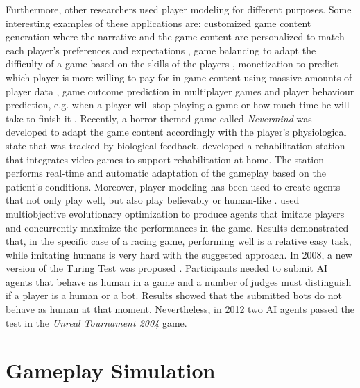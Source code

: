 Furthermore, other researchers used player modeling for different purposes. Some interesting examples of these applications are: customized game content generation where the narrative and the game content are personalized to match each player's preferences and expectations \cite{togelius_search-based_2011,yannakakis_experience-driven_2011,mateas_facade:_2003,togelius_multiobjective_2010,di_chio_evolving_2011}, game balancing to adapt the difficulty of a game based on the skills of the players \cite{lanzi_evolving_2014,hunicke_case_2005,andrade_challenge-sensitive_2005}, monetization to predict which player is more willing to pay for in-game content using massive amounts of player data \cite{fields_mobile_2014}, game outcome prediction in multiplayer games \cite{chen_player_2017,pobiedina_successful_2013,pobiedina_ranking_2013,yang_identifying_2014} and player behaviour prediction, e.g. when a player will stop playing a game or how much time he will take to finish it \cite{mahlmann_predicting_2010}.  Recently, a horror-themed game called \textit{Nevermind} \cite{lobel_designing_2016} was developed to adapt the game content accordingly with the player's physiological state that was tracked by biological feedback. 
\textcite{pirovano_self-adaptive_2012} developed a rehabilitation station that integrates video games to support rehabilitation at home. The station performs real-time and automatic adaptation of the gameplay based on the patient's conditions. 
Moreover, player modeling has been used to create agents that not only play well, but also play believably or human-like \cite{ortega_imitating_2013,gorman_bayesian_2006,wehbe_left_2017}. \textcite{hoorn_robust_2009} used multiobjective evolutionary optimization to produce agents that imitate players and concurrently maximize the performances in the game. Results demonstrated that, in the specific case of a racing game, performing well is a relative easy task, while imitating humans is very hard with the suggested approach. In 2008, a new version of the Turing Test was proposed \cite{hingston_turing_2009}. Participants needed to submit \acs{AI} agents that behave as human in a game and a number of judges must distinguish if a player is a human or a bot. Results showed that the submitted bots do not behave as human at that moment. Nevertheless, in 2012 two AI agents \cite{schrum_ut2:_2011, polceanu_mirrorbot:_2013} passed the test in the \textit{Unreal Tournament 2004} game. 

\section{Gameplay Simulation}

